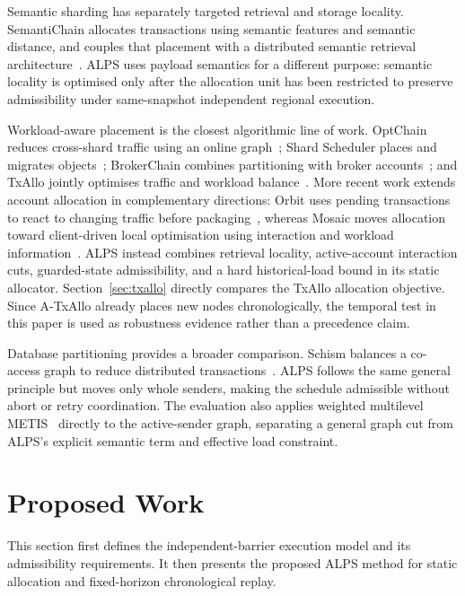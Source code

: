 \documentclass[runningheads]{llncs}
\begin{document}
Semantic sharding has separately targeted retrieval and storage locality.
SemantiChain allocates transactions using semantic features and semantic
distance, and couples that placement with a distributed semantic retrieval
architecture~\cite{zhen2024semantichain}. ALPS uses payload semantics for a
different purpose: semantic locality is optimised only after the allocation unit
has been restricted to preserve admissibility under same-snapshot independent
regional execution.

Workload-aware placement is the closest algorithmic line of work. OptChain
reduces cross-shard traffic using an online graph~\cite{optchain2019}; Shard
Scheduler places and migrates objects~\cite{shardscheduler2021}; BrokerChain
combines partitioning with broker accounts~\cite{brokerchain2022}; and TxAllo
jointly optimises traffic and workload balance~\cite{txallo2023}. More recent
work extends account allocation in complementary directions: Orbit uses pending
transactions to react to changing traffic before packaging~\cite{wang2024orbit},
whereas Mosaic moves allocation toward client-driven local optimisation using
interaction and workload information~\cite{zhang2025mosaic}. ALPS instead
combines retrieval locality, active-account interaction cuts, guarded-state
admissibility, and a hard historical-load bound in its static allocator.
Section~\ref{sec:txallo} directly compares the TxAllo allocation objective.
Since A-TxAllo already places new nodes chronologically, the temporal test in
this paper is used as robustness evidence rather than a precedence claim.

Database partitioning provides a broader comparison. Schism balances a
co-access graph to reduce distributed transactions~\cite{curino2010}. ALPS
follows the same general principle but moves only whole senders, making the
schedule admissible without abort or retry coordination.
The evaluation also applies weighted multilevel METIS~\cite{karypis1998metis}
directly to the active-sender graph, separating a general graph cut from ALPS's
explicit semantic term and effective load constraint.

\section{Proposed Work}
\label{sec:methodology}

This section first defines the independent-barrier execution model and its admissibility requirements. It then presents the proposed ALPS method for static allocation and fixed-horizon chronological replay.
\end{document}
